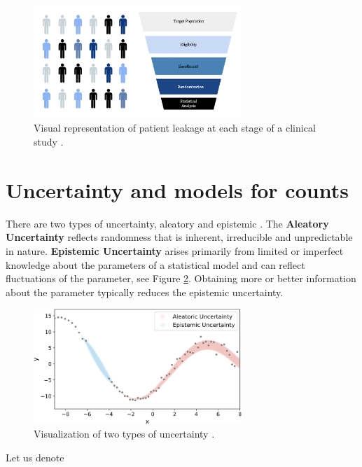 \begin{figure}[h]
  \centering
  \includegraphics[width=0.7\textwidth]{fig_2_1_b.png}
  \caption{Visual representation of patient leakage at each stage of a clinical study \citep{piantadosi2022principles, whelan2018high, bogin2022lasagna}.}
  \label{fig:2_1_b}
\end{figure}

\section{Uncertainty and models for counts}

There are two types of uncertainty, aleatory and epistemic \citep{ohagan2006}. The \textbf{Aleatory Uncertainty} reflects randomness that is inherent, irreducible and unpredictable in nature. \textbf{Epistemic Uncertainty} arises primarily from limited or imperfect knowledge about the parameters of a statistical model and can reflect fluctuations of the parameter, see Figure \ref{fig:2_1_c}. Obtaining more or better information about the parameter typically reduces the epistemic uncertainty. 

\begin{figure}[h]
  \centering
  \includegraphics[width=0.7\textwidth]{illustration_uncertainty.png}
  \caption{Visualization of two types of uncertainty \citep{yang2023explainable}.}
  \label{fig:2_1_c}
\end{figure}

Let us denote

